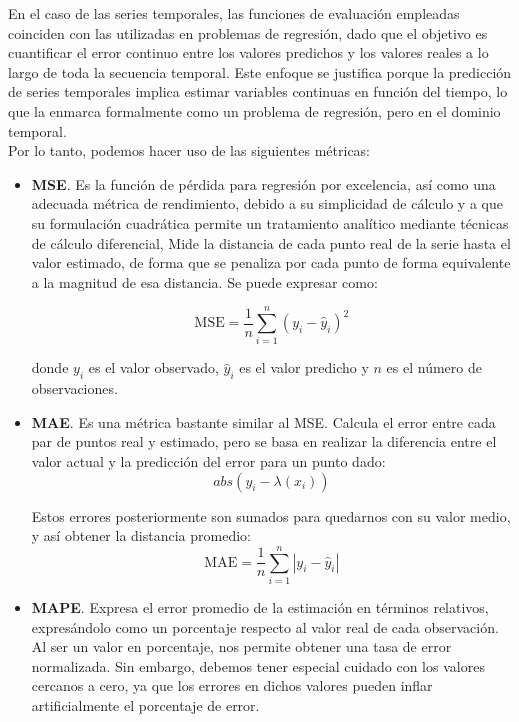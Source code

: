 En el caso de las series temporales, las funciones de evaluación empleadas coinciden con las utilizadas en problemas de regresión, dado que el objetivo es cuantificar el error continuo entre los valores predichos y los valores reales a lo largo de toda la secuencia temporal. Este enfoque se justifica porque la predicción de series temporales implica estimar variables continuas en función del tiempo, lo que la enmarca formalmente como un problema de regresión, pero en el dominio temporal.\\

Por lo tanto, podemos hacer uso de las siguientes métricas:

\begin{itemize}
	\item \textbf{MSE}. Es la función de pérdida para regresión por excelencia, así como una adecuada métrica de rendimiento, debido a su simplicidad de cálculo y a que su formulación cuadrática permite un tratamiento analítico mediante técnicas de cálculo diferencial, Mide la distancia de cada punto real de la serie hasta el valor estimado, de forma que se penaliza por cada punto de forma equivalente a la magnitud de esa distancia. Se puede expresar como:
	
	$$\mathrm{MSE} = \frac{1}{n} \sum_{i=1}^n (y_i - \hat{y}_i)^2$$ 
	
	donde \(y_i\) es el valor observado, \(\hat{y}_i\) es el valor predicho y \(n\) es el número de observaciones.  
	
	
	\item \textbf{MAE}. Es una métrica bastante similar al MSE. Calcula el error entre cada par de puntos real y estimado, pero se basa en realizar la diferencia entre el valor actual y la predicción del error para un punto dado:
	$$abs(y_i - \lambda (x_i))$$
	
	Estos errores posteriormente son sumados para quedarnos con su valor medio, y así obtener la distancia promedio:
	$$\mathrm{MAE} = \frac{1}{n} \sum_{i=1}^n \left| y_i - \hat{y}_i \right|$$
	
	
	\item \textbf{MAPE}. Expresa el error promedio de la estimación en términos relativos, expresándolo como un porcentaje respecto al valor real de cada observación. Al ser un valor en porcentaje, nos permite obtener una tasa de error normalizada. Sin embargo, debemos tener especial cuidado con los valores cercanos a cero, ya que los errores en dichos valores pueden inflar artificialmente el porcentaje de error.
	

\end{itemize}
